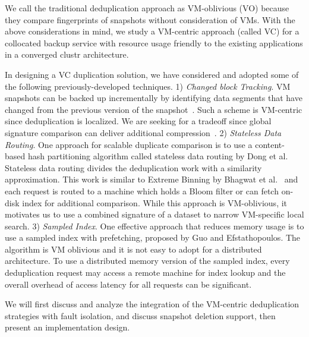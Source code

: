 We call the traditional deduplication approach as   VM-oblivious (VO)
because they compare fingerprints of snapshots without consideration of VMs.
With the above  considerations in mind, we study a 
VM-centric approach (called VC)
for a collocated backup service with resource usage friendly
to the existing applications in a converged clustr architecture.  

In designing a VC duplication solution, we have considered and adopted some of
the following previously-developed techniques.
1)
{\em Changed block Tracking}.
VM snapshots can be  backed up  incrementally by identifying data segments that have
changed from the previous version of the snapshot~\cite{Clements2009,Vrable2009,TanIPDPS2011}.
Such a scheme  is  VM-centric since deduplication is localized. 
We are seeking for a tradeoff since 
global signature comparison can deliver additional compression~\cite{Guo2011,Dong2011,extreme_binning09}.
2) {\em Stateless  Data Routing}.
One approach for scalable duplicate comparison is to use a content-based hash
partitioning algorithm called stateless data routing by Dong et al.~\cite{Dong2011} 
Stateless data routing divides the deduplication work with a similarity approximation. This work 
is similar to Extreme Binning by Bhagwat et al.~\cite{extreme_binning09} and 
each request is routed  to a machine which holds
a Bloom filter  or can fetch on-disk index for additional comparison.
While this approach is VM-oblivious, it motivates us to  use  a combined signature of a dataset to narrow
VM-specific local search.
3) {\em Sampled Index}.
One effective approach that reduces memory usage is 
to use a sampled index with prefetching, proposed  by Guo and Efstathopoulos\cite{Guo2011}. 
The algorithm is VM oblivious and it is not easy  to adopt for a distributed architecture. 
To use a distributed memory version of the sampled index, every deduplication request
may access a remote machine for index lookup and the overall overhead of access latency for all requests
can be significant.  

We will first discuss and analyze the integration of the VM-centric deduplication strategies with fault isolation, 
and discuss snapshot deletion support, then present an implementation design. 
